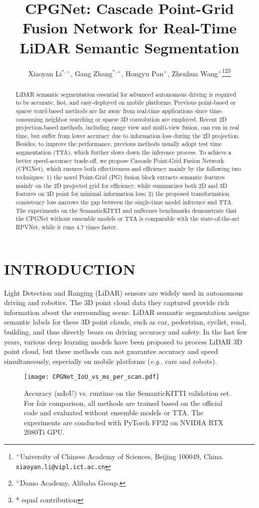 \documentclass[letterpaper, 10 pt, conference]{ieeeconf}
\title{\LARGE \bf CPGNet: Cascade Point-Grid Fusion Network for Real-Time LiDAR Semantic Segmentation}
\author{Xiaoyan Li$^{*,+}$, Gang Zhang$^{*,\times}$, Hongyu Pan$^{\times}$, Zhenhua Wang$^{\times}$\thanks{$^{+}$University of Chinese Academy of Sciences, Beijing 100049, China.
{\tt\small xiaoyan.li@vipl.ict.ac.cn}}\thanks{$^{\times}$Damo Academy, Alibaba Group.
\newline {\tt\small zhanggang11021136@gmail.com}
\newline {\tt\small hongyu.pan@alibaba-inc.com}
\newline {\tt\small zhwang.me@gmail.com}}\thanks{* equal contribution}
}
\makeatletter
\DeclareRobustCommand\onedot{\futurelet\@let@token\@onedot}
\def\@onedot{\ifx\@let@token.\else.\null\fi\xspace}
\def\eg{\emph{e.g}\onedot} \def\Eg{\emph{E.g}\onedot}
\makeatother
\begin{document}
\maketitle
\thispagestyle{empty}
\pagestyle{empty}


\begin{abstract}
LiDAR semantic segmentation essential for advanced autonomous driving is required to be accurate,
fast, and easy-deployed on mobile platforms. Previous point-based or sparse voxel-based methods are far away from
real-time applications since time-consuming neighbor searching or sparse 3D convolution are employed. Recent 2D projection-based methods,
including range view and multi-view fusion, can run in real
time, but suffer from lower accuracy due to information loss during the 2D projection. Besides, to improve the performance, previous methods usually adopt test time augmentation (TTA), which further slows down the inference process. To achieve a better speed-accuracy trade-off, we propose Cascade Point-Grid Fusion Network (CPGNet), which ensures both effectiveness and efficiency mainly by the following two techniques: 1) the novel Point-Grid (PG) fusion block extracts semantic features mainly on the 2D projected grid for efficiency, while summarizes both 2D and 3D features on 3D point for minimal information loss; 2) the proposed transformation consistency loss narrows the gap between the single-time model inference and TTA. The experiments on the SemanticKITTI and nuScenes benchmarks demonstrate that the CPGNet without ensemble models or TTA is comparable with the state-of-the-art RPVNet, while it runs $4.7$ times faster.
\end{abstract}


\section{INTRODUCTION}
Light Detection and Ranging (LiDAR) sensors are widely used in autonomous driving and robotics. The 3D point cloud data they captured provide rich information about the surrounding scene. LiDAR semantic segmentation assigns semantic labels for these 3D point clouds, such as car, pedestrian, cyclist, road, building, and thus directly bears on driving accuracy and safety. In the last few years, various deep learning models have been proposed to process LiDAR 3D point cloud, but these methods can not guarantee accuracy and speed simultaneously, especially on mobile platforms (\eg cars and robots).

\begin{figure}[t]
\centering
\texttt{[image: CPGNet\_IoU\_vs\_ms\_per\_scan.pdf]}
\caption{Accuracy (mIoU) vs. runtime on the SemanticKITTI validation set. For fair comparison, all methods are trained based on the official code and evaluated without ensemble models or TTA. The experiments are conducted with PyTorch FP32 on NVIDIA RTX 2080Ti GPU.}
\label{Fig_iou_vs_speed}
\end{figure}
\end{document}
